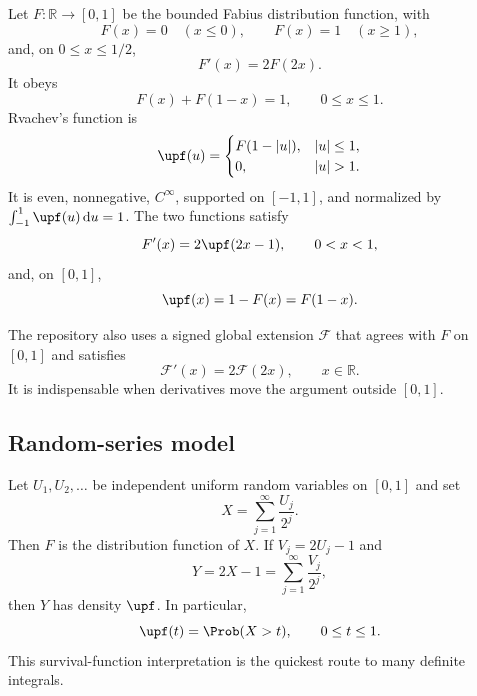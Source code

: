 \documentclass[11pt,oneside]{article}
\theoremstyle{definition}
\theoremstyle{remark}
\newcommand{\R}{\mathbb R}
\newcommand{\dd}{\,\mathrm d}
\newcommand{\1}{\mathbf 1}
\begin{document}
Let $F:\R\to[0,1]$ be the bounded Fabius distribution function, with
\begin{equation}\label{p5:eq:F-boundary}
 F(x)=0\quad(x\le0),
 \qquad F(x)=1\quad(x\ge1),
\end{equation}
and, on $0\le x\le1/2$,
\begin{equation}\label{p5:eq:F-differential}
 F'(x)=2F(2x).
\end{equation}
It obeys
\begin{equation}\label{p5:eq:F-symmetry}
 F(x)+F(1-x)=1,
 \qquad 0\le x\le1.
\end{equation}
Rvachev's function is
\begin{equation}\label{p5:eq:up-definition}
 \upf(u)=
 \begin{cases}
 F(1-|u|),&|u|\le1,\\
 0,&|u|>1.
 \end{cases}
\end{equation}
It is even, nonnegative, $C^\infty$, supported on $[-1,1]$, and normalized by
$\int_{-1}^{1}\upf(u)\dd u=1$.  The two functions satisfy
\begin{equation}\label{p5:eq:Fprime-up}
 F'(x)=2\upf(2x-1),
 \qquad 0<x<1,
\end{equation}
and, on $[0,1]$,
\begin{equation}\label{p5:eq:up-survival}
 \upf(x)=1-F(x)=F(1-x).
\end{equation}

The repository also uses a signed global extension $\mathcal F$ that agrees with $F$ on $[0,1]$ and satisfies
\begin{equation}\label{p5:eq:signed-differential}
 \mathcal F'(x)=2\mathcal F(2x),
 \qquad x\in\R.
\end{equation}
It is indispensable when derivatives move the argument outside $[0,1]$.

\subsection{Random-series model}

Let $U_1,U_2,\ldots$ be independent uniform random variables on $[0,1]$ and set
\begin{equation}\label{p5:eq:X-random-series}
 X=\sum_{j=1}^{\infty}\frac{U_j}{2^j}.
\end{equation}
Then $F$ is the distribution function of $X$.  If $V_j=2U_j-1$ and
\begin{equation}\label{p5:eq:Y-random-series}
 Y=2X-1=\sum_{j=1}^{\infty}\frac{V_j}{2^j},
\end{equation}
then $Y$ has density $\upf$.  In particular,
\begin{equation}\label{p5:eq:up-tail-probability}
 \upf(t)=\Prob(X>t),
 \qquad 0\le t\le1.
\end{equation}
This survival-function interpretation is the quickest route to many definite integrals.
\end{document}
